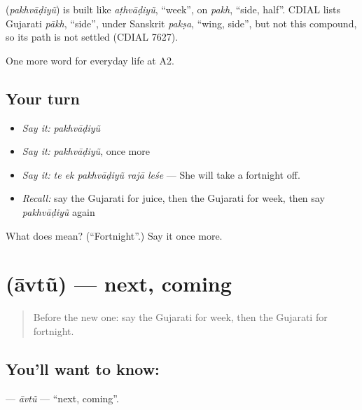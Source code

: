 \begin{cousinweb}
\textbf{} (\emph{pakhvāḍiyũ}) is built like \emph{aṭhvāḍiyũ}, \textquotedblleft{}week\textquotedblright{}, on \emph{pakh}, \textquotedblleft{}side, half\textquotedblright{}. CDIAL lists Gujarati \emph{pākh}, \textquotedblleft{}side\textquotedblright{}, under Sanskrit \emph{pakṣa}, \textquotedblleft{}wing, side\textquotedblright{}, but not this compound, so its path is not settled (CDIAL 7627).
\end{cousinweb}

\begin{grammarlens}[title={What you've built}]
One more word for everyday life at A2.
\end{grammarlens}

\subsection*{Your turn}
\begin{itemize}
\raggedright
  \item \emph{Say it:} \emph{pakhvāḍiyũ}
  \item \emph{Say it:} \emph{pakhvāḍiyũ}, once more
  \item \emph{Say it:} \emph{te ek pakhvāḍiyũ rajā leśe} — She will take a fortnight off.
  \item \emph{Recall:} say the Gujarati for juice, then the Gujarati for week, then say \emph{pakhvāḍiyũ} again
\end{itemize}

\begin{tcolorbox}[breakable,colback=teal!4,colframe=teal!35!black,title={Before you move on}]
What does  mean? (\textquotedblleft{}Fortnight\textquotedblright{}.) Say it once more.
\end{tcolorbox}
\section[\texorpdfstring{\gu{આવતું} (āvtũ)}{આવતું (āvtũ)}]{ (āvtũ) — next, coming}

\label{lesson:GU-C173-avtu}



\begin{quote}
Before the new one: say the Gujarati for week, then the Gujarati for fortnight.
\end{quote}

\subsection*{You'll want to know: }
\textbf{} — \emph{āvtũ} — \textquotedblleft{}next, coming\textquotedblright{}.

